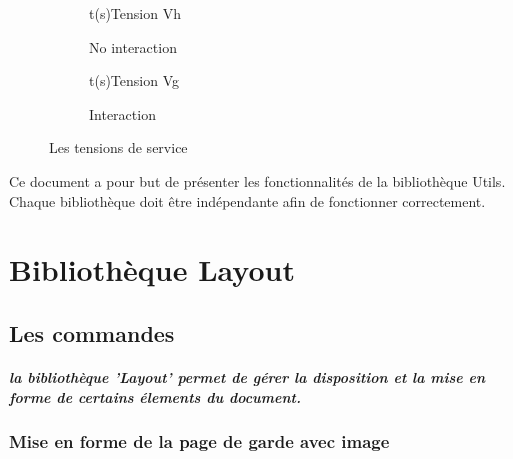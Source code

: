   \begin{figure}[h]  
  \centering 
    \begin{subfigure}[b]{0.4\linewidth}
      \begin{graphic}{0.8}{1}{0}{1.2}{-1}{5}{t(s)}{Tension V}{h}
        \end{graphic}%
      \caption{No interaction} 
    \end{subfigure}
  \begin{subfigure}[b]{0.4\linewidth}
    \begin{graphic}{0.8}{1}{0}{4}{-0.3}{0.3}{t(s)}{Tension V}{g}
      \end{graphic}%
  \caption{Interaction}
  \end{subfigure}
  \caption{Les tensions de service}
  \end{figure}  

Ce document a pour but de présenter les fonctionnalités de la bibliothèque Utils. \n
Chaque bibliothèque doit être indépendante afin de fonctionner correctement.


\chapter{Bibliothèque Layout}


\section{Les commandes}

\paragraph{la bibliothèque 'Layout' permet de gérer la disposition et la mise en forme de certains élements du document. \\}

\subsection{Mise en forme de la page de garde avec image}

